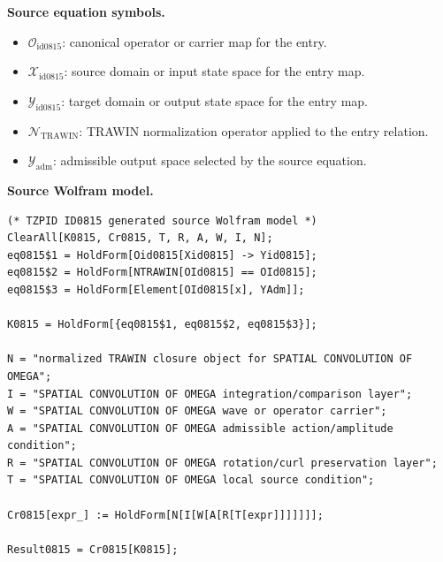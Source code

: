 \begin{minipage}[t]{0.49\linewidth}
\begingroup
\small
\raggedright
\textbf{Source equation symbols.}\par
\begin{itemize}[leftmargin=1.35em,itemsep=1pt,topsep=1pt,parsep=0pt]
    \item $\mathcal{O}_{\mathrm{id0815}}$: canonical operator or carrier map for the entry.
    \item $\mathcal{X}_{\mathrm{id0815}}$: source domain or input state space for the entry map.
    \item $\mathcal{Y}_{\mathrm{id0815}}$: target domain or output state space for the entry map.
    \item $\mathcal{N}_{\mathrm{TRAWIN}}$: TRAWIN normalization operator applied to the entry relation.
    \item $\mathcal{Y}_{\mathrm{adm}}$: admissible output space selected by the source equation.
\end{itemize}
\endgroup
\end{minipage}\hfill
\begin{minipage}[t]{0.47\linewidth}
\begingroup
\scriptsize
\raggedright
\textbf{Source Wolfram model.}\par
\begin{Verbatim}[fontsize=\tiny,breaklines=true,breakanywhere=true]
(* TZPID ID0815 generated source Wolfram model *)
ClearAll[K0815, Cr0815, T, R, A, W, I, N];
eq0815$1 = HoldForm[Oid0815[Xid0815] -> Yid0815];
eq0815$2 = HoldForm[NTRAWIN[OId0815] == OId0815];
eq0815$3 = HoldForm[Element[OId0815[x], YAdm]];

K0815 = HoldForm[{eq0815$1, eq0815$2, eq0815$3}];

N = "normalized TRAWIN closure object for SPATIAL CONVOLUTION OF OMEGA";
I = "SPATIAL CONVOLUTION OF OMEGA integration/comparison layer";
W = "SPATIAL CONVOLUTION OF OMEGA wave or operator carrier";
A = "SPATIAL CONVOLUTION OF OMEGA admissible action/amplitude condition";
R = "SPATIAL CONVOLUTION OF OMEGA rotation/curl preservation layer";
T = "SPATIAL CONVOLUTION OF OMEGA local source condition";

Cr0815[expr_] := HoldForm[N[I[W[A[R[T[expr]]]]]]];

Result0815 = Cr0815[K0815];
\end{Verbatim}
\endgroup
\end{minipage}

